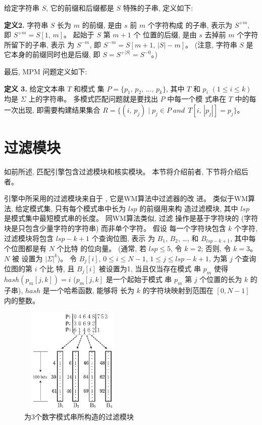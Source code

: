 给定字符串 $S$, 它的前缀和后缀都是 $S$ 特殊的子串, 定义如下:

\textbf{定义2.} 字符串 $S$ 长为 $m$ 的前缀, 是由 $s$ 前 $m$ 个字符构成
的子串, 表示为 $S^{+m}$, 即 $S^{+m}=S[1,\,m]$。  起始于 $S$ 第 $m+1$ 个
位置的后缀, 是由 $s$ 去掉前 $m$ 个字符所留下的子串, 表示
为 $S^{-m}$, 即 $S^{-m} = S[m+1,\,|S|-m]$。 (注意, 字符串 $S$
是它本身的前缀同时也是后缀, 即 $S=S^{+|S|}=S^{-0}$。)

最后, MPM 问题定义如下: 

\textbf{定义 3.} 给定文本串 $T$ 和模式
集 $P=\{p_1,\,p_2,\,\dots,\,p_k\}$, 其中 $T$ 和 $p_i$ $(1 \leq i \leq
k)$ 均是 $\Sigma$ 上的字符串。 多模式匹配问题就是要找出 $P$ 中每一个模
式串在 $T$ 中的每一次出现, 即需要构建结果集合
$R = \{(i,\, p_j)\;|\; p_j \in P\; and\,\; T[i,\,|p_j|]=p_j\}$。


\section{过滤模块}
\label{sec:filter}

如前所述, 匹配引擎包含过滤模块和核实模块。 本节将介绍前者, 下节将介绍后
者。

引擎中所采用的过滤模块来自于 \cite{Lee2013}, 它是WM算法中过滤器的改
进。 类似于WM算法, 给定模式集, 只有每个模式串中长为 $lsp$ 的前缀用来构
造过滤模块, 其中 $lsp$ 是模式集中最短模式串的长度。 同WM算法类似, 过滤
操作是基于字符块的 (字符块是只包含少量字符的字符串) 而非单个字符。 假设
每一个字符块包含 $k$ 个字符, 过滤模块将包含 $lsp-k+1$ 个查询位图, 表示
为 $B_1$, $B_2$, \dots, 和 $B_{lsp-k+1}$, 其中每个位图都是有 $N$ 个比特
的位向量。  (通常, 若 $lsp \leq 5$, 令 $k = 2$; 否则, 令 $k=3$。$N$ 被
设置为 $|\Sigma|^k$)。 令 $B_j[i]$, $0 \leq i \leq N - 1$,
$1 \leq j \leq lsp-k+1$, 为第 $j$ 个查询位图的第 $i$ 个比
特, 且 $B_j[i]$ 被设置为1, 当且仅当存在模式
串 $p_m$ 使得 $hash(p_m[j,k]) = i$ ($p_m[j,k]$ 是一个起始于模式
串 $p_m$ 第 $j$ 个位置的长为 $k$ 的子串), $hash$ 是一个哈希函数, 能够将
长为 $k$ 的字符块映射到范围在 $[0, N-1]$ 内的整数。

\begin{figure}[!h]
  \centering
  \includegraphics[height=2in, width=2in]{figures/2_MPM/filter.eps}
  \caption{为3个数字模式串所构造的过滤模块}
  \label{fig:filter}
\end{figure}

